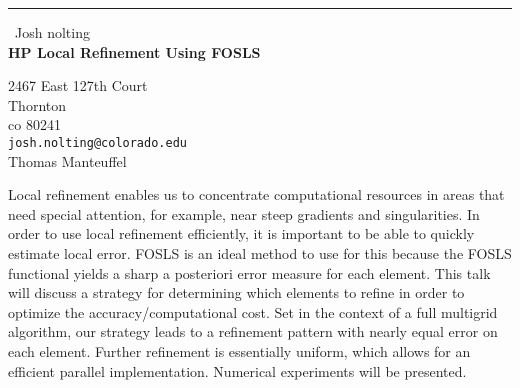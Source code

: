 \documentclass{report}
\begin{document}
\begin{center}
\rule{6in}{1pt} \
{\large Josh nolting \\
{\bf HP Local Refinement Using FOSLS }}

2467 East 127th Court \\ Thornton \\ co 80241
\\
{\tt josh.nolting@colorado.edu}\\
Thomas Manteuffel\end{center}

Local refinement enables us to concentrate computational resources in areas
that need special attention, for example, near steep gradients and
singularities.  In order to use local refinement efficiently, it is important
to be able to quickly estimate local error. FOSLS is an ideal method to use for
this because the FOSLS functional yields a sharp a posteriori error measure for
each element. This talk will discuss a strategy for determining which elements
to refine in order to optimize the accuracy/computational cost. Set in the
context of a full multigrid
algorithm, our strategy leads to a refinement pattern with nearly equal error on
each element. Further refinement is essentially uniform, which allows for an
efficient parallel implementation. Numerical experiments will be presented. 
\end{document}
